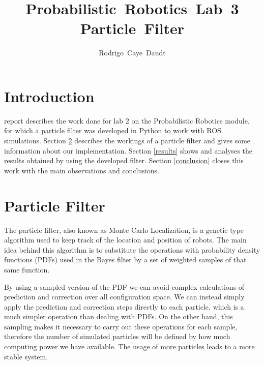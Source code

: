 \documentclass[journal]{IEEEtran}
\begin{document}
\title{Probabilistic~Robotics~Lab~3 \\ Particle~Filter}
%

\author{Rodrigo~Caye~Daudt}





\maketitle



\section{Introduction}

 report describes the work done for lab 2 on the Probabilistic Robotics module, for which a particle filter was developed in Python to work with ROS simulations. Section \ref{pf} describes the workings of a particle filter and gives some information about our implementation. Section \ref{results} shows and analyses the results obtained by using the developed filter. Section \ref{conclusion} closes this work with the main observations and conclusions.

\section{Particle Filter}\label{pf}

The particle filter, also known as Monte Carlo Localization, is a genetic type algorithm used to keep track of the location and position of robots. The main idea behind this algorithm is to substitute the operations with probability density functions (PDFs) used in the Bayes filter by a set of weighted samples of that same function.

By using a sampled version of the PDF we can avoid complex calculations of prediction and correction over all configuration space. We can instead simply apply the prediction and correction steps directly to each particle, which is a much simpler operation than dealing with PDFs. On the other hand, this sampling makes it necessary to carry out these operations for each sample, therefore the number of simulated particles will be defined by how much computing power we have available. The usage of more particles leads to a more stable system.
\end{document}
